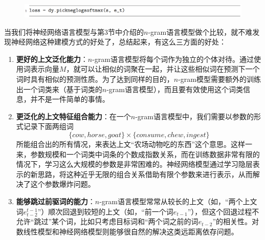 \documentclass[10pt,a4paper]{ctexart}
\begin{document}
\begin{figure}[H]
\centering
\includegraphics[width=1\textwidth]{fig131.png}
\end{figure}

当我们将神经网络语言模型与第3节中介绍的$n$-gram语言模型做个比较，就不难发现神经网络这种建模方式的好处了，总结起来，有这么三方面的好处：
\begin{enumerate}
\item[] \textbf{更好的上文泛化能力}：$n$-gram语言模型将每个词作为独立的个体对待。通过使用词表示向量$M$，就可以让相似的词聚在一起，并让这些相似词在预测下一个词时具有相似的预测性质。为了达到同样的目的，$n$-gram模型需要额外的训练出一个词类来（基于词类的$n$-gram语言模型），而且要有效使用这个词类信息，并不是一件简单的事情\cite{brown1992class}。
\item[] \textbf{更泛化的上文特征组合能力}：在一个$n$-gram语言模型中，我们需要以参数的形式记录下面两组词\[\{cow,horse,goat\}\times\{consume,chew,ingest\}\]所能组合出的所有情况，来表达上文“农场动物吃的东西”这个意思。这样一来，参数规模和一个词类中词条的个数成指数关系，而在训练数据非常有限的情况下，学习这么大规模的参数是非常困难的。神经网络模型通过学习隐层表示的新思路，将这种近乎无限的组合关系借助有限个参数来进行表示，从而解决了这个参数爆炸问题。
\item[] \textbf{能够跳过前驱词的能力}：$n$-gram语言模型常常从较长的上文（如，“两个上文词$e_{t-2}^{t-1}$”）顺次回退到较短的上文（如，“前一个词$e_{t-1}$”），但这个回退过程不允许“跳过”某个词，比如只考虑目标词和“两个词之前的词$e_{t-2}$”的相关性。对数线性模型和神经网络模型则能够很自然的解决这类远距离依存问题。
\end{enumerate}
\end{document}
